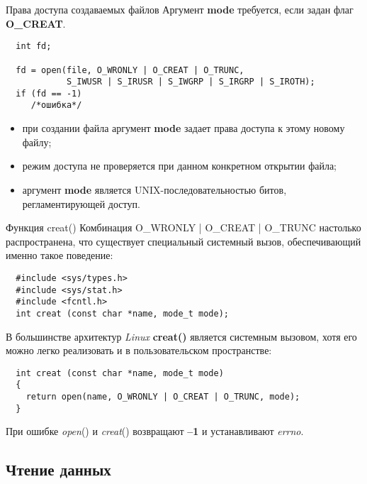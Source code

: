 \documentclass[xcolor=table]{beamer}
\begin{document}
\begin{frame}[fragile]{Права доступа создаваемых файлов}
	Аргумент \textbf{mode} требуется, если задан флаг \textbf{O\_CREAT}. 
	\begin{verbatim}
  int fd;

  fd = open(file, O_WRONLY | O_CREAT | O_TRUNC,
            S_IWUSR | S_IRUSR | S_IWGRP | S_IRGRP | S_IROTH);
  if (fd == -1)
     /*ошибка*/
	\end{verbatim}  
	\begin{itemize}
		\item при создании файла аргумент \textbf{mode} задает права доступа к этому новому файлу;
		\item режим доступа не проверяется при данном конкретном открытии файла;
		\item аргумент \textbf{mode} является UNIX-­последовательностью битов, регламентирующей доступ.
	\end{itemize}
\end{frame}

\begin{frame}[fragile]{Функция creat()}
	Комбинация O\_WRONLY | O\_CREAT | O\_TRUNC настолько распространена, что существует специальный системный вызов, обеспечивающий именно такое поведение: 
  \begin{verbatim}
  #include <sys/types.h>
  #include <sys/stat.h>        
  #include <fcntl.h>     
  int creat (const char *name, mode_t mode);
  \end{verbatim}  
	В большинстве архитектур \textit{Linux} \textbf{creat()} является системным вызовом, хотя его можно легко реализовать и в пользовательском пространстве:

\begin{verbatim}
  int creat (const char *name, mode_t mode)
  {
    return open(name, O_WRONLY | O_CREAT | O_TRUNC, mode);
  }
\end{verbatim}

	При ошибке \textit{open}() и \textit{creat}() возвращают \textbf{–1} и устанавливают \textit{errno}.
\end{frame}

\subsection{Чтение данных}
\end{document}
